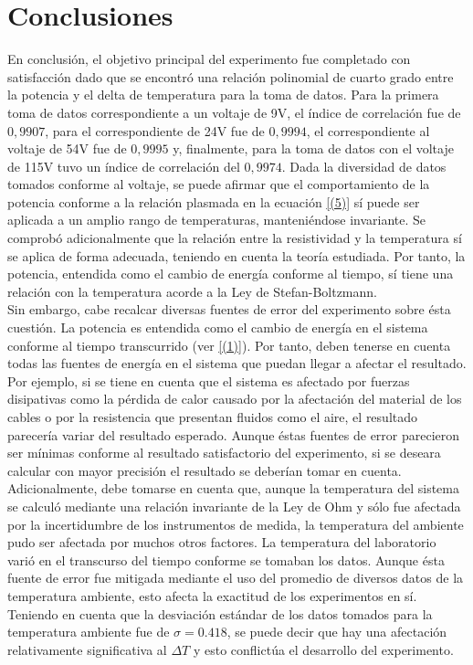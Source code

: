 \documentclass[%
 reprint,
 amsmath,amssymb,
 aps,
]{revtex4-1}
\begin{document}
\section{\label{sec:level1} Conclusiones}

En conclusión, el objetivo principal del experimento fue completado con satisfacción dado que se encontró una relación polinomial de cuarto grado entre la potencia y el delta de temperatura para la toma de datos. Para la primera toma de datos correspondiente a un voltaje de 9V, el índice de correlación fue de $0,9907$, para el correspondiente de 24V fue de $0,9994$, el correspondiente al voltaje de 54V fue de $0,9995$ y, finalmente, para la toma de datos con el voltaje de 115V tuvo un índice de correlación del $0,9974$. Dada la diversidad de datos tomados conforme al voltaje, se puede afirmar que el comportamiento de la potencia conforme a la relación plasmada en la ecuación \eqref{(5)} sí puede ser aplicada a un amplio rango de temperaturas, manteniéndose invariante. Se comprobó adicionalmente que la relación entre la resistividad y la temperatura sí se aplica de forma adecuada, teniendo en cuenta la teoría estudiada. Por tanto, la potencia, entendida como el cambio de energía conforme al tiempo, sí tiene una relación con la temperatura acorde a la Ley de Stefan-Boltzmann. \\

Sin embargo, cabe recalcar diversas fuentes de error del experimento sobre ésta cuestión. La potencia es entendida como el cambio de energía en el sistema conforme al tiempo transcurrido (ver \eqref{(1)}). Por tanto, deben tenerse en cuenta todas las fuentes de energía en el sistema que puedan llegar a afectar el resultado. Por ejemplo, si se tiene en cuenta que el sistema es afectado por fuerzas disipativas como la pérdida de calor causado por la afectación del material de los cables o por la resistencia que presentan fluidos como el aire, el resultado parecería variar del resultado esperado. Aunque éstas fuentes de error parecieron ser mínimas conforme al resultado satisfactorio del experimento, si se deseara calcular con mayor precisión el resultado se deberían tomar en cuenta.\\

Adicionalmente, debe tomarse en cuenta que, aunque la temperatura del sistema se calculó mediante una relación invariante de la Ley de Ohm y sólo fue afectada por la incertidumbre de los instrumentos de medida, la temperatura del ambiente pudo ser afectada por muchos otros factores. La temperatura del laboratorio varió en el transcurso del tiempo conforme se tomaban los datos. Aunque ésta fuente de error fue mitigada mediante el uso del promedio de diversos datos de la temperatura ambiente, esto afecta la exactitud de los experimentos en sí. Teniendo en cuenta que la desviación estándar de los datos tomados para la temperatura ambiente fue de $\sigma = 0.418$, se puede decir que hay una afectación relativamente significativa al $\Delta T$ y esto conflictúa el desarrollo del experimento.


\end{document}
